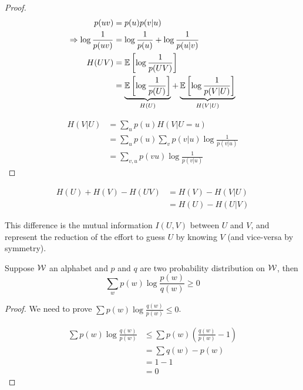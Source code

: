 \begin{proof}
    \[
        \begin{aligned}
           p(uv) &= p(u) p(v\vert u)\\
           \Rightarrow \log \frac{1}{p(uv)} &= \log \frac{1}{p(u)} + \log \frac{1}{p(u\vert v)}\\
           H(UV) &= \mathbb{E}\left[ \log \frac{1}{p(UV)} \right]\\
           &= \underbrace{\mathbb{E}\left[ \log\frac{1}{p(U)} \right]}_{H(U)} + \underbrace{\mathbb{E}\left[ \log\frac{1}{p(V\vert U)} \right]}_{H(V\vert U)}
        \end{aligned}            
    \]

    \[
        \begin{aligned}
            H(V\vert U) &= \sum_u p(u) H(V\vert U=u)\\
            &= \sum_u p(u) \sum_v p(v\vert u) \log \frac{1}{p(v\vert u)}\\
            &= \sum_{v,u} p(vu) \log \frac{1}{p(v\vert u)}
        \end{aligned}
    \]
\end{proof}

\begin{definition}
\[
    \begin{aligned}
        H(U) + H(V) - H(UV) &= H(V) - H(V\vert U)\\
        &= H(U) - H(U\vert V)
    \end{aligned}
\]

This difference is the mutual information $I(U,V)$ between $U$ and $V$, and represent the reduction of the effort to guess $U$ by knowing $V$ (and vice-versa by symmetry).
\end{definition}

\begin{lemma}
    Suppose $\mathcal{W}$ an alphabet and $p$ and $q$ are two probability distribution on $\mathcal{W}$, then
    \[
        \sum\limits_w p(w) \log \frac{p(w)}{q(w)}\geqslant 0
    \]
\end{lemma}
\begin{proof}
    We need to prove $\sum p(w) \log \frac{q(w)}{p(w)} \leqslant 0$.
    
    \[
        \begin{aligned}
            \sum p(w) \log \frac{q(w)}{p(w)} &\leqslant \sum p(w) (\frac{q(w)}{p(w)}-1)\\
            &= \sum q(w) - p(w)\\
            &= 1-1\\
            &= 0
        \end{aligned}            
    \]
\end{proof}

